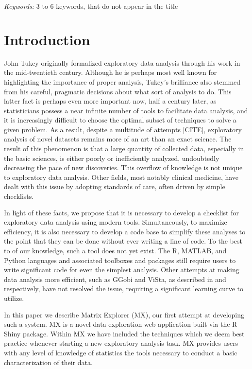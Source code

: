 \documentclass[12pt]{article}
\begin{document}
\noindent%
{\it Keywords:}  3 to 6 keywords, that do not appear in the title
\vfill

\newpage
{} %
\section{Introduction}
\label{sec:intro}

John Tukey originally formalized exploratory data analysis through his work in the mid-twentieth century. Although he is perhaps most well known for highlighting the importance of proper analysis, Tukey's brilliance also stemmed from his careful, pragmatic decisions about what sort of analysis to do. This latter fact is perhaps even more important now, half a century later, as statisticians possess a near infinite number of tools to facilitate data analysis, and it is increasingly difficult to choose the optimal subset of techniques to solve a given problem. As a result, despite a multitude of attempts [CITE], exploratory analysis of novel datasets remains more of an art than an exact science. The result of this phenomenon is that a large quantity of collected data, especially in the basic sciences, is either poorly or inefficiently analyzed, undoubtedly decreasing the pace of new discoveries. This overflow of knowledge is not unique to exploratory data analysis. Other fields, most notably clinical medicine, have dealt with this issue by adopting standards of care, often driven by simple checklists. 

In light of these facts, we propose that it is necessary to develop a checklist for exploratory data analysis using modern tools. Simultaneously, to maximize efficiency, it is also necessary to develop a code base to simplify these analyses to the point that they can be done without ever writing a line of code. To the best to of our knowledge, such a tool does not yet exist. The R, MATLAB, and Python languages and associated toolboxes and packages still require users to write significant code for even the simplest analysis. Other attempts at making data analysis more efficient, such as GGobi and ViSta, as described in \cite{swayne2003ggobi} and \cite{valero2011using} respectively, have not resolved the issue, requiring a significant learning curve to utilize.

In this paper we describe Matrix Explorer (MX), our first attempt at developing such a system. MX is a novel data exploration web application built via the R Shiny package. Within MX we have included the techniques which we deem best practice whenever starting a new exploratory analysis task. MX provides users with any level of knowledge of statistics the tools necessary to conduct a basic characterization of their data.
\end{document}
